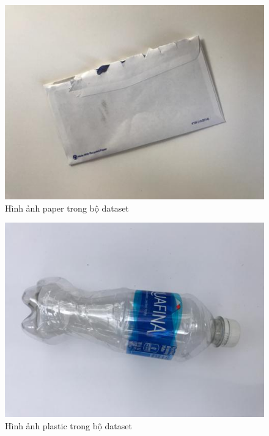 \begin{figure}[H]
    \centering
    \includegraphics[width=\linewidth]{images/Quanh/paper96.jpg}
    \caption{Hình ảnh paper trong bộ dataset}
    \label{fig:paper}
\end{figure}

\begin{figure}[H]
    \centering
    \includegraphics[width=\linewidth]{images/Quanh/plastic49.jpg}
    \caption{Hình ảnh plastic trong bộ dataset}
    \label{fig:plastic}
\end{figure}

